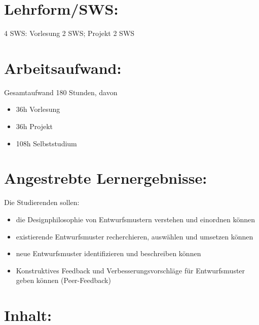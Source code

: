 \section*{Lehrform/SWS:\label{/mi-2017/modulbeschreibungen-master/MA_SC_Soziotechnische_Entwurfsmuster}}\label{lehrformswspathlabelmi-2017modulbeschreibungen-mastermaux5fscux5fsoziotechnischeux5fentwurfsmuster}

4 SWS: Vorlesung 2 SWS; Projekt 2 SWS

\section*{Arbeitsaufwand:\label{/mi-2017/modulbeschreibungen-master/MA_SC_Soziotechnische_Entwurfsmuster}}\label{arbeitsaufwandpathlabelmi-2017modulbeschreibungen-mastermaux5fscux5fsoziotechnischeux5fentwurfsmuster}

Gesamtaufwand 180 Stunden, davon

\begin{itemize}
\tightlist
\item
  36h Vorlesung
\item
  36h Projekt
\item
  108h Selbststudium
\end{itemize}

\section*{Angestrebte
Lernergebnisse:\label{/mi-2017/modulbeschreibungen-master/MA_SC_Soziotechnische_Entwurfsmuster}}\label{angestrebte-lernergebnissepathlabelmi-2017modulbeschreibungen-mastermaux5fscux5fsoziotechnischeux5fentwurfsmuster}

Die Studierenden sollen:

\begin{itemize}
\tightlist
\item
  die Designphilosophie von Entwurfsmustern verstehen und einordnen
  können
\item
  existierende Entwurfsmuster recherchieren, auswählen und umsetzen
  können
\item
  neue Entwurfsmuster identifizieren und beschreiben können
\item
  Konstruktives Feedback und Verbesserungsvorschläge für Entwurfsmuster
  geben können (Peer-Feedback)
\end{itemize}

\section*{Inhalt:\label{/mi-2017/modulbeschreibungen-master/MA_SC_Soziotechnische_Entwurfsmuster}}\label{inhaltpathlabelmi-2017modulbeschreibungen-mastermaux5fscux5fsoziotechnischeux5fentwurfsmuster}

